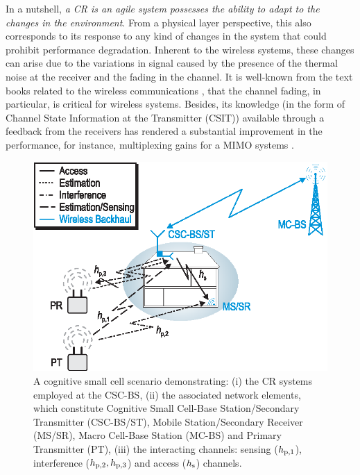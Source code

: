 In a nutshell, \textit{a CR is an agile system possesses the ability to adapt to the changes in the environment}. From a physical layer perspective, this also corresponds to its response to any kind of changes in the system that could prohibit performance degradation. Inherent to the wireless systems, these changes can arise due to the variations in signal caused by the presence of the thermal noise at the receiver and the fading in the channel. It is well-known from the text books related to the wireless communications \cite{simon2005, Goldsmith05, Tse05}, that the channel fading, in particular, is critical for wireless systems. Besides, its knowledge (in the form of Channel State Information at the Transmitter (CSIT)) available through a feedback from the receivers has rendered a substantial improvement in the performance, for instance, multiplexing gains for a MIMO systems \cite{Ali12}. 


\begin{figure}[!t]
\centering
\includegraphics[width = \figscalet]{figures/CR_Scenario_Hybrid}
\caption{A cognitive small cell scenario demonstrating: (i) the CR systems employed at the CSC-BS, (ii) the associated network elements, which constitute Cognitive Small Cell-Base Station/Secondary Transmitter (CSC-BS/ST), Mobile Station/Secondary Receiver (MS/SR), Macro Cell-Base Station (MC-BS) and Primary Transmitter (PT), (iii) the interacting channels: sensing ($h_{\text{p,1}}$), interference ($h_{\text{p,2}}, h_{\text{p,3}}$) and access ($h_{\text{s}}$) channels.}
\label{fig_Int:scenario}
\end{figure}


